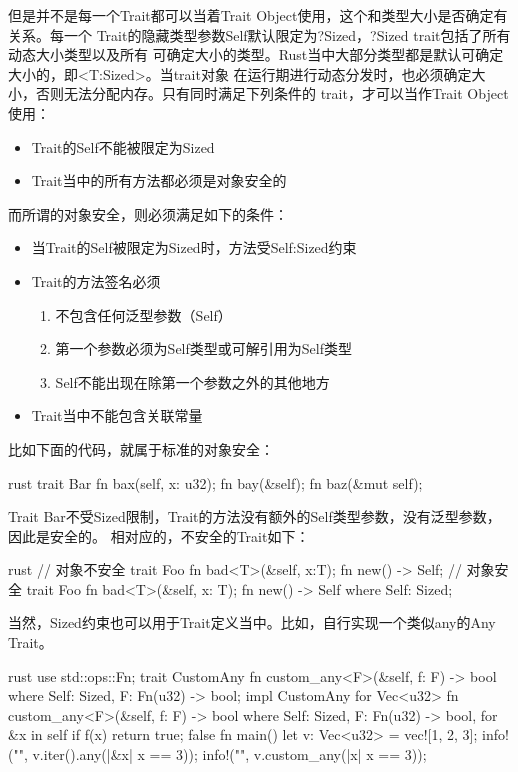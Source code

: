 但是并不是每一个Trait都可以当着Trait Object使用，这个和类型大小是否确定有关系。每一个
Trait的隐藏类型参数Self默认限定为?Sized，?Sized trait包括了所有动态大小类型以及所有
可确定大小的类型。Rust当中大部分类型都是默认可确定大小的，即<T:Sized>。当trait对象
在运行期进行动态分发时，也必须确定大小，否则无法分配内存。只有同时满足下列条件的
trait，才可以当作Trait Object使用：
\begin{itemize}
  \item Trait的Self不能被限定为Sized
  \item Trait当中的所有方法都必须是对象安全的
\end{itemize}

而所谓的对象安全，则必须满足如下的条件：
\begin{itemize}
  \item 当Trait的Self被限定为Sized时，方法受Self:Sized约束
  \item Trait的方法签名必须
  \begin{enumerate}
    \item 不包含任何泛型参数（Self）
    \item 第一个参数必须为Self类型或可解引用为Self类型
    \item Self不能出现在除第一个参数之外的其他地方
  \end{enumerate}
  \item Trait当中不能包含关联常量
\end{itemize}

比如下面的代码，就属于标准的对象安全：
\begin{code-block}{rust}
trait Bar {
    fn bax(self, x: u32);
    fn bay(&self);
    fn baz(&mut self);
}
\end{code-block}
Trait Bar不受Sized限制，Trait的方法没有额外的Self类型参数，没有泛型参数，因此是安全的。
相对应的，不安全的Trait如下：
\begin{code-block}{rust}
// 对象不安全
trait Foo {
    fn bad<T>(&self, x:T);
    fn new() -> Self;
}
// 对象安全
trait Foo {
    fn bad<T>(&self, x: T);
    fn new() -> Self
    where
        Self: Sized;
}
\end{code-block}

当然，Sized约束也可以用于Trait定义当中。比如，自行实现一个类似any的Any Trait。
\begin{code-block}{rust}
use std::ops::Fn;
trait CustomAny {
    fn custom_any<F>(&self, f: F) -> bool
    where
        Self: Sized,
        F: Fn(u32) -> bool;
}
impl CustomAny for Vec<u32> {
    fn custom_any<F>(&self, f: F) -> bool
    where
        Self: Sized,
        F: Fn(u32) -> bool,
    {
        for &x in self {
            if f(x) {
                return true;
            }
        }
        false
    }
}
fn main() {
    let v: Vec<u32> = vec![1, 2, 3];
    info!("{}", v.iter().any(|&x| x == 3));
    info!("{}", v.custom_any(|x| x == 3));
}
\end{code-block}


